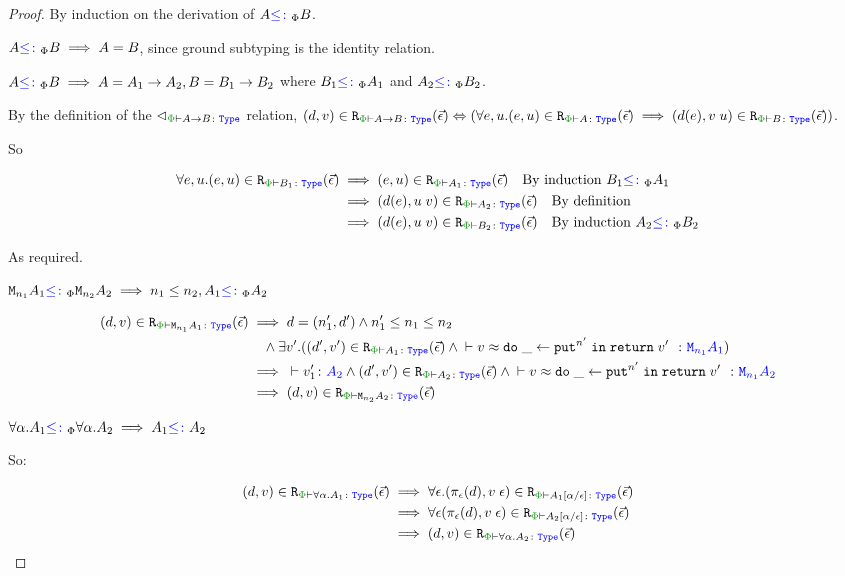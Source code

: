 \documentclass{Report}
\newcommand\erelates[2]{\texttt{R}_{\wellformedt{#1}{#2}}}
\newcommand\inLogRel[5]{(#1, #2)\in\erelates{#3}{#4}(#5)}
\newcommand\inLogRelE[4]{\inLogRel{#1}{#2}{#3}{#4}{\ev}}
\newcommand{\inLogRelPE}[3]{\inLogRelE{#1}{#2}{\P}{#3}}
\begin{document}
\begin{proof}
    By induction on the derivation of $A{\color{blue} \leq\colon}_\Phi B$.

    \case{\sground}
        $A{\color{blue} \leq\colon}_\Phi B\implies A = B$, since ground subtyping is the identity relation.

    \case{\sfun}
        $A{\color{blue} \leq\colon}_\Phi B\implies A = A_1\rightarrow A_2, B = B_1\rightarrow B_2$ where $B_1{\color{blue} \leq\colon}_\Phi A_1$ and $A_2{\color{blue} \leq\colon}_\Phi B_2$.

        By the definition of the $\relates_{\wellformedt{\P}{\ab}}$ relation, $\inLogRelPE{d}{v}{\ab} \Leftrightarrow (\forall e, u. \inLogRelPE{e}{u}{A}\implies \inLogRelPE{d(e)}{\apply{v}{u}}{B})$.

        So 

        \begin{align*}
            \forall e, u. \inLogRelPE{e}{u}{B_1} & \implies \inLogRelPE{e}{u}{A_1} \qt{By induction $B_1\subtypep A_1$}\\
            & \implies \inLogRelPE{d(e)}{\apply{u}{v}}{A_2}\qt{By definition}\\
            & \implies \inLogRelPE{d(e)}{\apply{u}{v}}{B_2}\qt{By induction $A_2\subtypep B_2$}
        \end{align*}

        As required.
    \case{\seffect}

    $\texttt{M}_{n_1}{A_1} {\color{blue} \leq\colon}_\Phi \texttt{M}_{n_2}{A_2} \implies n_1\leq n_2, A_1{\color{blue} \leq\colon}_\Phi A_2$

    \begin{align*}
        \inLogRelPE{d}{v}{\M{n_1}{A_1}} & \implies  d=(n_1', d') \wedge n_1' \leq n_1\leq n_2 
        \\ & \quad\wedge \exists v'. (\inLogRelPE{d'}{v'}{A_1} \wedge\zberelation{v}{\doin{\_}{\put^{n'}}{\return{v'}}}{\M{n_1}{A_1}})
        \\
        & \implies \ztyperelation{v_1'}{A_2} \wedge \inLogRelPE{d'}{v'}{A_2} \wedge \zberelation{v}{\doin{\_}{\put^{n'}}{\return{v'}}}{\M{n_1}{A_2}}
        \\
        & \implies \inLogRelPE{d}{v}{\M{n_2}{A_2}}
    \end{align*}

    \case{\squant}
    $\forall \alpha. A_1{\color{blue} \leq\colon}_\Phi \forall \alpha. A_2\implies A_1{\color{blue} \leq\colon} A_2$

    So:

    \begin{align*}
        \inLogRelPE{d}{v}{\all{\a}{A_1}} & \implies \forall \e.\inLogRelPE{\pe(d)}{\eapp{v}{\e}}{A_1\ssub{\e}{\a}}\\
        & \implies \forall\e \inLogRelPE{\pe(d)}{\eapp{v}{\e}}{A_2\ssub{\e}{\a}}\\
        & \implies \inLogRelPE{d}{v}{\all{\a}{A_2}}
    \end{align*}
\end{proof}
\end{document}
